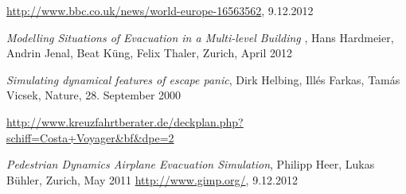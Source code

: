 \documentclass[11pt]{article}
\begin{document}
\begingroup 
\renewcommand{\section}[2]{}%
\begin{thebibliography}{9}

		\url{http://www.bbc.co.uk/news/world-europe-16563562}, 9.12.2012

	\emph{Modelling Situations of Evacuation
in a Multi-level Building} , 
Hans Hardmeier, Andrin Jenal, Beat Küng, Felix Thaler, Zurich, April 2012

		\emph{Simulating dynamical features of escape panic},
		Dirk Helbing, Ill\'es Farkas, Tam\'as Vicsek, Nature, 28. September 2000

		\url{http://www.kreuzfahrtberater.de/deckplan.php?schiff=Costa+Voyager&bf&dpe=2}

		\emph{Pedestrian Dynamics Airplane Evacuation Simulation},
		Philipp Heer, Lukas Bühler, Zurich, May 2011
		\url{http://www.gimp.org/}, 9.12.2012
\end{thebibliography}
\endgroup
\end{document}
